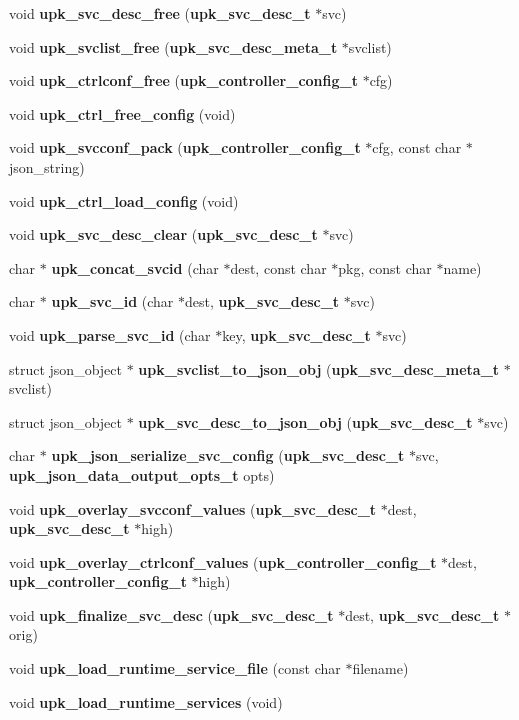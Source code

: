 \begin{DoxyCompactItemize}
\item 
void {\bf upk\_\-svc\_\-desc\_\-free} ({\bf upk\_\-svc\_\-desc\_\-t} $\ast$svc)
\item 
void {\bf upk\_\-svclist\_\-free} ({\bf upk\_\-svc\_\-desc\_\-meta\_\-t} $\ast$svclist)
\item 
void {\bf upk\_\-ctrlconf\_\-free} ({\bf upk\_\-controller\_\-config\_\-t} $\ast$cfg)
\item 
void {\bf upk\_\-ctrl\_\-free\_\-config} (void)
\item 
void {\bf upk\_\-svcconf\_\-pack} ({\bf upk\_\-controller\_\-config\_\-t} $\ast$cfg, const char $\ast$json\_\-string)
\item 
void {\bf upk\_\-ctrl\_\-load\_\-config} (void)
\item 
void {\bf upk\_\-svc\_\-desc\_\-clear} ({\bf upk\_\-svc\_\-desc\_\-t} $\ast$svc)
\item 
char $\ast$ {\bf upk\_\-concat\_\-svcid} (char $\ast$dest, const char $\ast$pkg, const char $\ast$name)
\item 
char $\ast$ {\bf upk\_\-svc\_\-id} (char $\ast$dest, {\bf upk\_\-svc\_\-desc\_\-t} $\ast$svc)
\item 
void {\bf upk\_\-parse\_\-svc\_\-id} (char $\ast$key, {\bf upk\_\-svc\_\-desc\_\-t} $\ast$svc)
\item 
struct json\_\-object $\ast$ {\bf upk\_\-svclist\_\-to\_\-json\_\-obj} ({\bf upk\_\-svc\_\-desc\_\-meta\_\-t} $\ast$svclist)
\item 
struct json\_\-object $\ast$ {\bf upk\_\-svc\_\-desc\_\-to\_\-json\_\-obj} ({\bf upk\_\-svc\_\-desc\_\-t} $\ast$svc)
\item 
char $\ast$ {\bf upk\_\-json\_\-serialize\_\-svc\_\-config} ({\bf upk\_\-svc\_\-desc\_\-t} $\ast$svc, {\bf upk\_\-json\_\-data\_\-output\_\-opts\_\-t} opts)
\item 
void {\bf upk\_\-overlay\_\-svcconf\_\-values} ({\bf upk\_\-svc\_\-desc\_\-t} $\ast$dest, {\bf upk\_\-svc\_\-desc\_\-t} $\ast$high)
\item 
void {\bf upk\_\-overlay\_\-ctrlconf\_\-values} ({\bf upk\_\-controller\_\-config\_\-t} $\ast$dest, {\bf upk\_\-controller\_\-config\_\-t} $\ast$high)
\item 
void {\bf upk\_\-finalize\_\-svc\_\-desc} ({\bf upk\_\-svc\_\-desc\_\-t} $\ast$dest, {\bf upk\_\-svc\_\-desc\_\-t} $\ast$orig)
\item 
void {\bf upk\_\-load\_\-runtime\_\-service\_\-file} (const char $\ast$filename)
\item 
void {\bf upk\_\-load\_\-runtime\_\-services} (void)
\end{DoxyCompactItemize}
